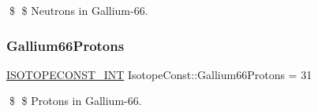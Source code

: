 \$ \$ Neutrons in Gallium-\/66. \mbox{\label{group___isotope_const-_gallium-_ga66_ga8de690ce8c5faf7b8a38cd45e13ccaf0}} 
\subsubsection{\texorpdfstring{Gallium66\+Protons}{Gallium66Protons}}
{\footnotesize\ttfamily \mbox{\hyperlink{group___isotope_const-_macros_ga5f18360b3e99483a35c32d789e62621c}{I\+S\+O\+T\+O\+P\+E\+C\+O\+N\+S\+T\+\_\+\+I\+NT}} Isotope\+Const\+::\+Gallium66\+Protons = 31}

\$ \$ Protons in Gallium-\/66. 